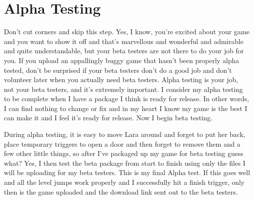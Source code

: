 \section{Alpha Testing}
Don't cut corners and skip this step. Yes, I know, you're excited about your game and you want to show it off and that's marvellous and wonderful and admirable and quite understandable, but your beta testers are not there to do your job for you. If you upload an appallingly buggy game that hasn't been properly alpha tested, don't be surprised if your beta testers don't do a good job and don't volunteer later when you actually need beta testers. Alpha testing is your job, not your beta testers, and it's extremely important. I consider my alpha testing to be complete when I have a package I think is ready for release. In other words, I can find nothing to change or fix and in my heart I know my game is the best I can make it and I feel it's ready for release. Now I begin beta testing.
\par During alpha testing, it is easy to move Lara around and forget to put her back, place temporary triggers to open a door and then forget to remove them and a few other little things, so after I've packaged up my game for beta testing guess what? Yes, I then test the beta package from start to finish using only the files I will be uploading for my beta testers. This is my final Alpha test. If this goes well and all the level jumps work properly and I successfully hit a finish trigger, only then is the game uploaded and the download link sent out to the beta testers.

\cite{NGLE_manual_hu}